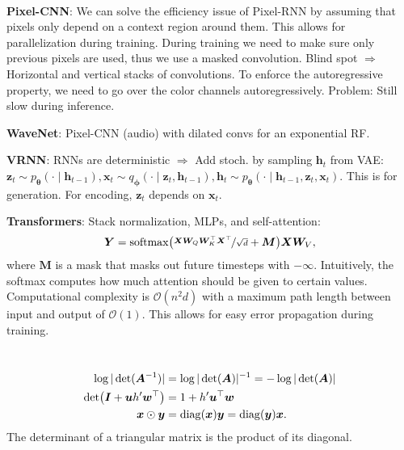 \documentclass{article}
\newcommand{\lft}{\mathopen{}\mathclose\bgroup\left}
\newcommand{\rgt}{\aftergroup\egroup\right}
\renewcommand{\vec}[1]{\bm{#1}}
\newcommand{\mat}[1]{\bm{#1}}
\newenvironment{topic}[1]
{\textbf{\sffamily \colorbox{black}{\rlap{\textbf{\textcolor{white}{#1}}}\hspace{\linewidth}\hspace{-2\fboxsep}}} \\ \vspace{0.2cm}}
{}
\begin{document}
\begin{multicols*}{2}
\begin{topic}{Autoregressive models}
        \textbf{Pixel-CNN}: We can solve the efficiency issue of Pixel-RNN by assuming that pixels
        only depend on a context region around them. This allows for parallelization during training.
        During training we need to make sure only previous pixels are used, thus we use a masked
        convolution. Blind spot $\Rightarrow$ Horizontal and vertical stacks of
        convolutions. To enforce the autoregressive property, we need to go over the color channels
        autoregressively. Problem: Still slow during inference.

        \textbf{WaveNet}: Pixel-CNN (audio) with dilated convs for an exponential RF.

        \textbf{VRNN}: RNNs are deterministic $\Rightarrow$ Add stoch. by sampling $\vec{h}_t$ from VAE:
        $\vec{z}_t \sim p_{\vec{\theta}}(\cdot \mid \vec{h}_{t-1}), \vec{x}_t \sim q_{\vec{\phi}}(\cdot \mid \vec{z}_t, \vec{h}_{t-1}), \vec{h}_t \sim p_{\vec{\theta}}(\cdot \mid \vec{h}_{t-1}, \vec{z}_t, \vec{x}_t)$. This is for generation. For encoding, $\vec{z}_t$ depends on $\vec{x}_t$.

        \textbf{Transformers}: Stack normalization, MLPs, and self-attention: \[
            \mat{Y} = \mathrm{softmax}\lft( \nicefrac{\mat{X} \mat{W}_Q \mat{W}_K^\top \mat{X}^\top}{\sqrt{d}} + \mat{M} \rgt) \mat{X} \mat{W}_V,
        \]
        where $\mat{M}$ is a mask that masks out future timesteps with $-\infty$. Intuitively, the softmax
        computes how much attention should be given to certain values. Computational complexity is
        $\mathcal{O}(n^2d)$ with a maximum path length between input and output of $\mathcal{O}(1)$. This
        allows for easy error propagation during training.
    \end{topic}

    \begin{topic}{Normalizing flow}
        \begin{align*}
            \log |\det(\mat{A}^{-1})|                          & = \log |\det(\mat{A})|^{-1} = -\log |\det(\mat{A})|                \\
            \det \lft( \mat{I} + \vec{u} h' \vec{w}^\top \rgt) & = 1 + h' \vec{u}^\top \vec{w}                                      \\
            \vec{x} \odot \vec{y}                              & = \mathrm{diag}(\vec{x}) \vec{y} = \mathrm{diag}(\vec{y}) \vec{x}.
        \end{align*}
        The determinant of a triangular matrix is the product of its diagonal.


\end{topic}
\end{multicols*}
\end{document}
